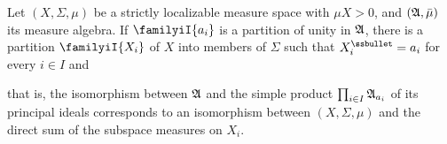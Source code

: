 
  Let $(X,\Sigma,\mu)$ be a strictly
localizable measure space with $\mu X>0$, and $(\frak A,\bar\mu)$ its
measure algebra.   If $\familyiI{a_i}$ is a partition of unity in
$\frak A$, there is a partition $\familyiI{X_i}$ of $X$ into members of
$\Sigma$ such that $X_i^{\ssbullet}=a_i$ for every $i\in I$ and



\noindent that is, the isomorphism between $\frak A$ and the simple
product $\prod_{i\in I}\frak A_{a_i}$ of its principal
ideals corresponds to an isomorphism between
$(X,\Sigma,\mu)$ and the direct sum of the subspace measures on $X_i$.

